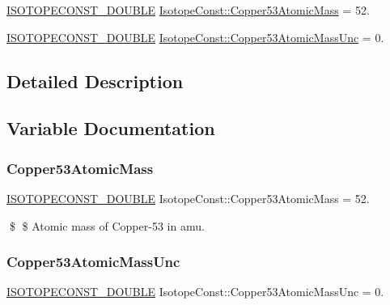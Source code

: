 \begin{DoxyCompactItemize}
\item 
\mbox{\hyperlink{group___isotope_const-_macros_ga8f45a7272ce02c0b4c65c44636ed719a}{I\+S\+O\+T\+O\+P\+E\+C\+O\+N\+S\+T\+\_\+\+D\+O\+U\+B\+LE}} \mbox{\hyperlink{group___isotope_const-_copper-_cu53_ga28a27f73cc8306cf5fe96ceff24cc0fd}{Isotope\+Const\+::\+Copper53\+Atomic\+Mass}} = 52.
\item 
\mbox{\hyperlink{group___isotope_const-_macros_ga8f45a7272ce02c0b4c65c44636ed719a}{I\+S\+O\+T\+O\+P\+E\+C\+O\+N\+S\+T\+\_\+\+D\+O\+U\+B\+LE}} \mbox{\hyperlink{group___isotope_const-_copper-_cu53_gaa81e218b97c5f0c0b27773138a39115e}{Isotope\+Const\+::\+Copper53\+Atomic\+Mass\+Unc}} = 0.
\end{DoxyCompactItemize}


\subsection{Detailed Description}


\subsection{Variable Documentation}
\mbox{\label{group___isotope_const-_copper-_cu53_ga28a27f73cc8306cf5fe96ceff24cc0fd}} 
\subsubsection{\texorpdfstring{Copper53\+Atomic\+Mass}{Copper53AtomicMass}}
{\footnotesize\ttfamily \mbox{\hyperlink{group___isotope_const-_macros_ga8f45a7272ce02c0b4c65c44636ed719a}{I\+S\+O\+T\+O\+P\+E\+C\+O\+N\+S\+T\+\_\+\+D\+O\+U\+B\+LE}} Isotope\+Const\+::\+Copper53\+Atomic\+Mass = 52.}

\$ \$ Atomic mass of Copper-\/53 in amu. \mbox{\label{group___isotope_const-_copper-_cu53_gaa81e218b97c5f0c0b27773138a39115e}} 
\subsubsection{\texorpdfstring{Copper53\+Atomic\+Mass\+Unc}{Copper53AtomicMassUnc}}
{\footnotesize\ttfamily \mbox{\hyperlink{group___isotope_const-_macros_ga8f45a7272ce02c0b4c65c44636ed719a}{I\+S\+O\+T\+O\+P\+E\+C\+O\+N\+S\+T\+\_\+\+D\+O\+U\+B\+LE}} Isotope\+Const\+::\+Copper53\+Atomic\+Mass\+Unc = 0.}

